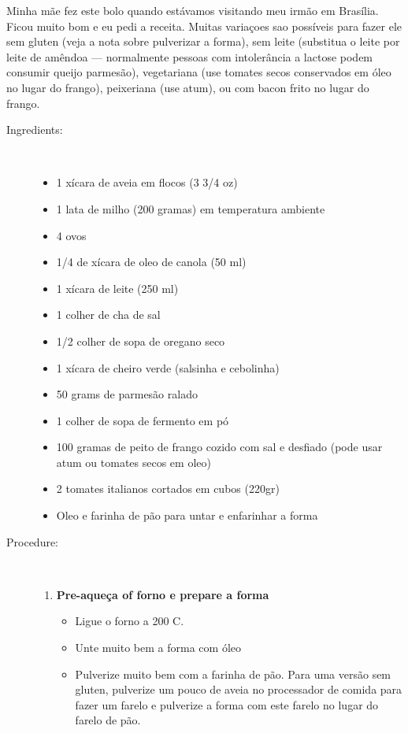 \documentclass[11pt,letterpaper]{article}
\begin{document}


Minha m\~ae fez este bolo quando est\'avamos visitando meu irm\~ao em Bras\'ilia. Ficou muito bom e eu pedi a receita. Muitas varia\c{c}oes sao poss\'iveis para fazer ele sem gluten (veja a nota sobre pulverizar a forma), sem leite (substitua o leite por leite de am\^endoa --- normalmente pessoas com intoler\^ancia a lactose podem consumir queijo parmes\~ao),  vegetariana (use tomates secos conservados em \'oleo no lugar do frango), peixeriana (use atum), ou com bacon frito no lugar do frango.
 
\begin{description}

\item[Ingredients:]\ \\
	\begin{itemize}
	\item 1 x\'icara de aveia em flocos (3 3/4 oz)
	\item 1 lata de milho (200 gramas) em temperatura ambiente
	\item 4 ovos
	\item 1/4 de x\'icara de oleo de canola (50 ml)
	\item 1 x\'icara de leite (250 ml)
	\item 1 colher de cha de sal
	\item 1/2 colher de sopa de oregano seco
	\item 1 x\'icara de cheiro verde (salsinha e cebolinha)
	\item 50 grams de parmes\~ao ralado
	\item 1 colher de sopa de fermento em p\'o
	\item 100 gramas de peito de frango cozido com sal e desfiado (pode usar atum ou tomates secos em oleo)
	\item 2 tomates italianos cortados em cubos (220gr)
	\item Oleo e farinha de p\~ao para untar e enfarinhar a forma
	\end{itemize}

\item[Procedure:]\ \\
	\begin{enumerate}
	\item {\bf Pre-aque\c{c}a of forno e prepare a forma}
	\begin{itemize}
	\item Ligue o forno a 200 C.
	\item Unte muito bem a forma com \'oleo
	\item Pulverize muito bem com a farinha de p\~ao. Para uma vers\~ao sem gluten, pulverize um pouco de aveia no processador de comida para fazer um farelo e pulverize a forma com este farelo no lugar do farelo de p\~ao.
	\end{itemize}
	

\end{enumerate}
\end{description}
\end{document}
